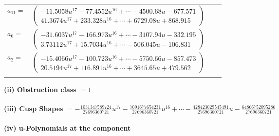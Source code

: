 \documentclass[1p]{elsarticle_modified}
\theoremstyle{definition}
\begin{document}
\begin{tabular}{m{7pt} m{180pt} m{7pt} m{180pt} }
\flushright $a_{11}=$&$\begin{pmatrix}-11.5058 u^{17}-77.4552 u^{16}+\cdots-4500.68 u-677.571\\41.3674 u^{17}+233.328 u^{16}+\cdots+6729.08 u+868.915\end{pmatrix}$ \\
\flushright $a_{6}=$&$\begin{pmatrix}-31.6037 u^{17}-166.973 u^{16}+\cdots-3107.94 u-332.195\\3.73112 u^{17}+15.7034 u^{16}+\cdots-506.045 u-106.831\end{pmatrix}$ \\
\flushright $a_{2}=$&$\begin{pmatrix}-15.4066 u^{17}-100.723 u^{16}+\cdots-5750.66 u-857.473\\20.5194 u^{17}+116.891 u^{16}+\cdots+3645.65 u+479.562\end{pmatrix}$\\&\end{tabular}
\flushleft \textbf{(ii) Obstruction class $= 1$}\\~\\
\flushleft \textbf{(iii) Cusp Shapes $= -\frac{1031347589724}{27696360721} u^{17}-\frac{7091677654231}{27696360721} u^{16}+\cdots-\frac{428423029545491}{27696360721} u-\frac{64866752095286}{27696360721}$}\\~\\
\newpage\renewcommand{\arraystretch}{1}
\flushleft \textbf{(iv) u-Polynomials at the component}\newline \\
\end{document}
